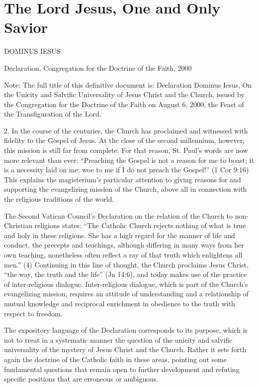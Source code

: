 \documentclass[oneside]{book}
\begin{document}

\chapter{The Lord Jesus, One and Only Savior}

DOMINUS IESUS

Declaration, Congregation for the Doctrine of
  the Faith, 2000


Note: The full title of this definitive document is: Declaration Dominus Iesus,
On the Unicity and Salvific Universality of Jesus Christ and the Church, issued
by the Congregation for the Doctrine of the Faith on August 6, 2000, the Feast
of the Transfiguration of the Lord.

2. In the course of the centuries, the Church has proclaimed and witnessed with
fidelity to the Gospel of Jesus. At the close of the second millennium, however,
this mission is still far from complete. For that reason, St. Paul's words are
now more relevant than ever: ``Preaching the Gospel is not a reason for me to
boast; it is a necessity laid on me: woe to me if I do not preach the Gospel!''
(1 Cor 9:16) This explains the magisterium's particular attention to giving
reasons for and supporting the evangelizing mission of the Church, above all in
connection with the religious traditions of the world.

The Second Vatican Council's Declaration on the relation of the Church to
non-Christian religions states: ``The Catholic Church rejects nothing of what is
true and holy in these religions. She has a high regard for the manner of life
and conduct, the precepts and teachings, although differing in many ways from
her own teaching, nonetheless often reflect a ray of that truth which enlightens
all men.'' (4) Continuing in this line of thought, the Church proclaims Jesus
Christ, ``the way, the truth and the life'' (Jn 14:6), and today makes use of
the practice of inter-religious dialogue. Inter-religious dialogue, which is
part of the Church's evangelizing mission, requires an attitude of understanding
and a relationship of mutual knowledge and reciprocal enrichment in obedience to
the truth with respect to freedom.

The expository language of the Declaration corresponds to its purpose, which is
not to treat in a systematic manner the question of the unicity and salvific
universality of the mystery of Jesus Christ and the Church. Rather it sets forth
again the doctrine of the Catholic faith in these areas, pointing out some
fundamental questions that remain open to further development and refuting
specific positions that are erroneous or ambiguous.
\end{document}
